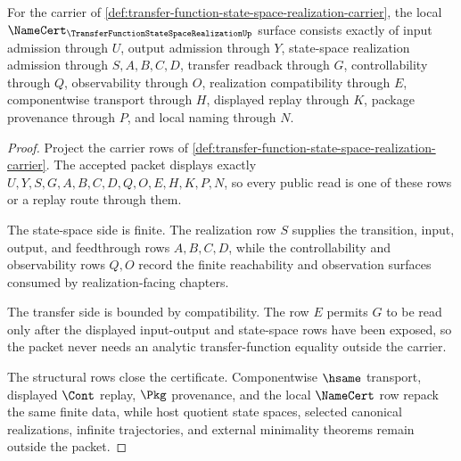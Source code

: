 \begin{theorem}
\label{thm:transfer-function-state-space-realization-obligations}
For the carrier of \autoref{def:transfer-function-state-space-realization-carrier}, the local $\NameCert_{\TransferFunctionStateSpaceRealizationUp}$ surface consists exactly of input admission through $U$, output admission through $Y$, state-space realization admission through $S,A,B,C,D$, transfer readback through $G$, controllability through $Q$, observability through $O$, realization compatibility through $E$, componentwise transport through $H$, displayed replay through $K$, package provenance through $P$, and local naming through $N$.
\end{theorem}
\begin{proof}
Project the carrier rows of \autoref{def:transfer-function-state-space-realization-carrier}. The accepted packet displays exactly $U,Y,S,G,A,B,C,D,Q,O,E,H,K,P,N$, so every public read is one of these rows or a replay route through them.

The state-space side is finite. The realization row $S$ supplies the transition, input, output, and feedthrough rows $A,B,C,D$, while the controllability and observability rows $Q,O$ record the finite reachability and observation surfaces consumed by realization-facing chapters.

The transfer side is bounded by compatibility. The row $E$ permits $G$ to be read only after the displayed input-output and state-space rows have been exposed, so the packet never needs an analytic transfer-function equality outside the carrier.

The structural rows close the certificate. Componentwise $\hsame$ transport, displayed $\Cont$ replay, $\Pkg$ provenance, and the local $\NameCert$ row repack the same finite data, while host quotient state spaces, selected canonical realizations, infinite trajectories, and external minimality theorems remain outside the packet.
\end{proof}


